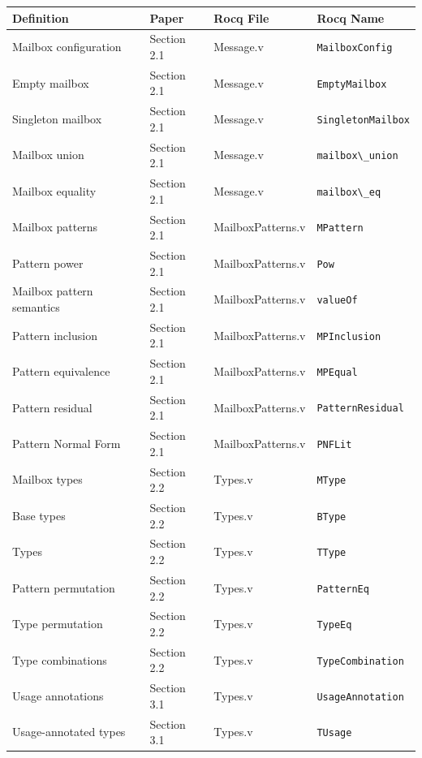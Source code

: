 \begin{tabularx}{\textwidth}{|L|l|l|l|}
\hline
    \textbf{Definition} & \textbf{Paper} & \textbf{Rocq File} & \textbf{Rocq Name} \\ \hline
    Mailbox configuration & Section 2.1 & Message.v & \lstinline|MailboxConfig| \\ \hline
    Empty mailbox & Section 2.1 & Message.v & \lstinline|EmptyMailbox| \\ \hline
    Singleton mailbox & Section 2.1 & Message.v & \lstinline|SingletonMailbox| \\ \hline
    Mailbox union & Section 2.1 & Message.v & \lstinline|mailbox\_union| \\ \hline
    Mailbox equality & Section 2.1 & Message.v & \lstinline|mailbox\_eq| \\ \hline
    Mailbox patterns & Section 2.1 & MailboxPatterns.v & \lstinline|MPattern| \\ \hline
    Pattern power & Section 2.1 & MailboxPatterns.v & \lstinline|Pow| \\ \hline
    Mailbox pattern semantics & Section 2.1 & MailboxPatterns.v & \lstinline|valueOf| \\ \hline
    Pattern inclusion & Section 2.1 & MailboxPatterns.v & \lstinline|MPInclusion| \\ \hline
    Pattern equivalence & Section 2.1 & MailboxPatterns.v & \lstinline|MPEqual| \\ \hline
    Pattern residual & Section 2.1 & MailboxPatterns.v & \lstinline|PatternResidual| \\ \hline
    Pattern Normal Form & Section 2.1 & MailboxPatterns.v & \lstinline|PNFLit| \\ \hline
    Mailbox types & Section 2.2 & Types.v & \lstinline|MType| \\ \hline
    Base types & Section 2.2 & Types.v & \lstinline|BType| \\ \hline
    Types & Section 2.2 & Types.v & \lstinline|TType| \\ \hline
    Pattern permutation & Section 2.2 & Types.v & \lstinline|PatternEq| \\ \hline
    Type permutation & Section 2.2 & Types.v & \lstinline|TypeEq| \\ \hline
    Type combinations & Section 2.2 & Types.v & \lstinline|TypeCombination| \\ \hline
    Usage annotations & Section 3.1 & Types.v & \lstinline|UsageAnnotation| \\ \hline
    Usage-annotated types & Section 3.1 & Types.v & \lstinline|TUsage| \\ \hline

\end{tabularx}
